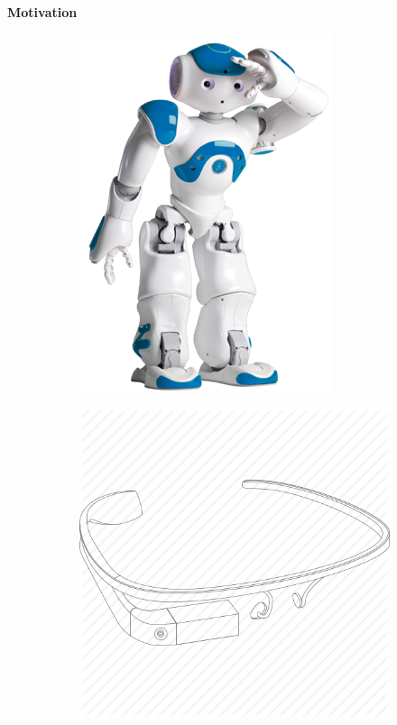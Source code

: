 \begin{frame}{\textbf{Motivation}}
\begin{figure}
\begin{subfigure}[c]{0.2\textwidth}
		\includegraphics[width=\textwidth]{./img/motivation2.png} \footnotemark
    \end{subfigure}\hspace{3em}%
    \begin{subfigure}[c]{0.2\textwidth}
		\includegraphics[width=\textwidth]{./img/motivation3.png} \footnotemark

\end{subfigure}
\end{figure}
\end{frame}
